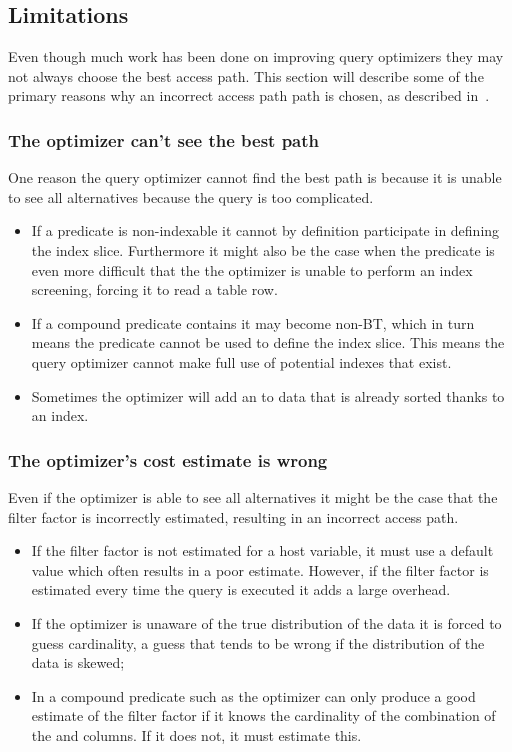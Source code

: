 \subsection{Limitations}
Even though much work has been done on improving query optimizers they may not
always choose the best access path. This section will describe some of the
primary reasons why an incorrect access path path is chosen, as described
in~\cite[Ch.~14]{lahdenmaki_2005_relational_rdidatodossea}.

\subsubsection{The optimizer can't see the best path}
One reason the query optimizer cannot find the best path is because it is unable
to see all alternatives because the query is too complicated.

\begin{itemize}
\item If a predicate is non-indexable it cannot by definition participate in
  defining the index slice. Furthermore it might also be the case when the
  predicate is even more difficult that the the optimizer is unable to perform
  an index screening, forcing it to read a table row.
\item If a compound predicate contains  it may become non-BT, which in
  turn means the predicate cannot be used to define the index slice. This means
  the query optimizer cannot make full use of potential indexes that exist.
\item Sometimes the optimizer will add an  to data that is already
  sorted thanks to an index.
\end{itemize}

\subsubsection{The optimizer's cost estimate is wrong}
Even if the optimizer is able to see all alternatives it might be the case that
the filter factor is incorrectly estimated, resulting in an incorrect access
path.

\begin{itemize}
\item If the filter factor is not estimated for a host variable, it must use a
  default value which often results in a poor estimate. However, if the filter
  factor is estimated every time the query is executed it adds a large
  overhead.
\item If the optimizer is unaware of the true distribution of the data it is
  forced to guess cardinality, a guess that tends to be wrong if the
  distribution of the data is skewed;
\item In a compound predicate such as  the optimizer can only produce a good estimate of the filter factor
  if it knows the cardinality of the combination of the  and
   columns. If it does not, it must estimate this.
\end{itemize}
